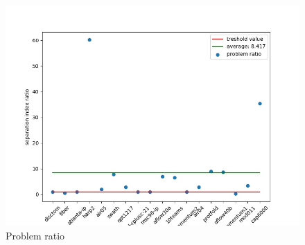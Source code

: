 \documentclass[12pt,a4paper,twoside,openright]{book}
\begin{document}
\begin{figure}[ht]
    \centering
    \includegraphics [scale = 0.7]{chart_agg}
    \caption{Problem ratio}
    \label{fig:ratio}
\end{figure}
\end{document}
